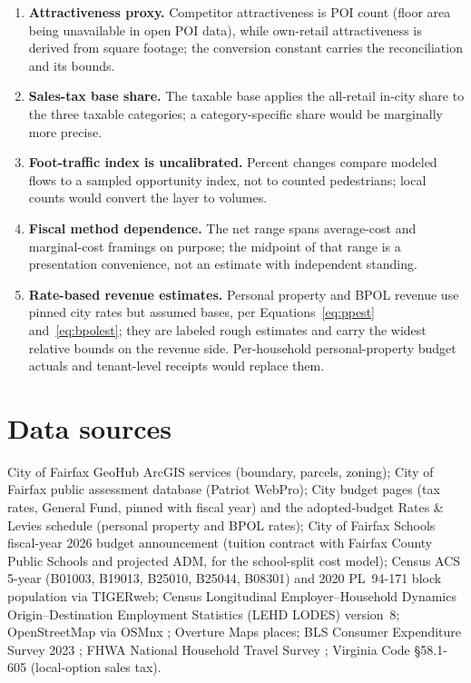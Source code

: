 \documentclass[11pt]{article}
\begin{document}
\begin{enumerate}
      environment quality is not separately modeled — for hostile walking
      environments, read the steep end of the band (0.15).
\item \textbf{Attractiveness proxy.} Competitor attractiveness is POI count
      (floor area being unavailable in open POI data), while own-retail
      attractiveness is derived from square footage; the conversion constant
      carries the reconciliation and its bounds.
\item \textbf{Sales-tax base share.} The taxable base applies the all-retail
      in-city share to the three taxable categories; a category-specific share
      would be marginally more precise.
\item \textbf{Foot-traffic index is uncalibrated.} Percent changes compare
      modeled flows to a sampled opportunity index, not to counted pedestrians;
      local counts would convert the layer to volumes.
\item \textbf{Fiscal method dependence.} The net range spans average-cost and
      marginal-cost framings on purpose; the midpoint of that range is a
      presentation convenience, not an estimate with independent standing.
\item \textbf{Rate-based revenue estimates.} Personal property and BPOL
      revenue use pinned city rates but assumed bases, per
      Equations~\eqref{eq:ppest} and~\eqref{eq:bpolest}; they are labeled
      rough estimates and carry the widest relative bounds on the revenue
      side. Per-household personal-property budget actuals and tenant-level
      receipts would replace them.
\end{enumerate}

\section{Data sources}

City of Fairfax GeoHub ArcGIS services (boundary, parcels, zoning); City of
Fairfax public assessment database (Patriot WebPro); City budget pages (tax
rates, General Fund, pinned with fiscal year) and the adopted-budget Rates \&
Levies schedule (personal property and BPOL rates); City of Fairfax Schools
fiscal-year 2026 budget announcement (tuition contract with Fairfax County
Public Schools and projected ADM, for the school-split cost model); Census
ACS 5-year (B01003,
B19013, B25010, B25044, B08301) and 2020 PL~94-171 block population via
TIGERweb; Census Longitudinal Employer--Household Dynamics Origin--Destination
Employment Statistics (LEHD LODES) version~8; OpenStreetMap via OSMnx
\cite{boeing2017}; Overture
Maps places; BLS Consumer Expenditure Survey 2023 \cite{blsces}; FHWA National
Household Travel Survey \cite{nhts}; Virginia Code \S 58.1-605 (local-option
sales tax).
\end{document}
